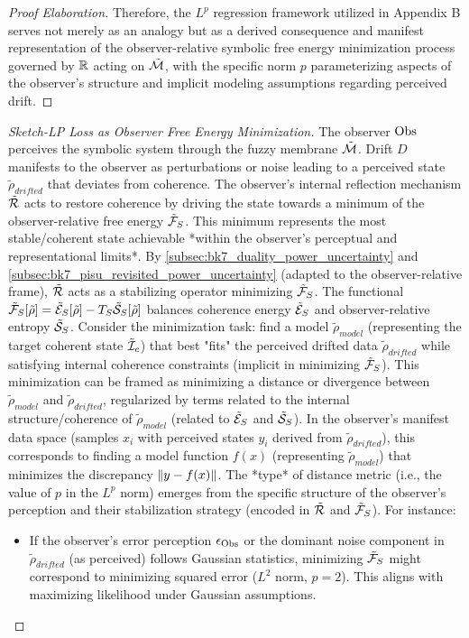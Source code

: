 \begin{proof}[Proof Elaboration]
Therefore, the \( L^p \) regression framework utilized in Appendix B serves not merely as an analogy but as a derived consequence and manifest representation of the observer-relative symbolic free energy minimization process governed by \( \mathbb{R} \) acting on \( \tilde{\mathcal{M}} \), with the specific norm \( p \) parameterizing aspects of the observer's structure and implicit modeling assumptions regarding perceived drift.
\end{proof}
\begin{proof}[Sketch-LP Loss as Observer Free Energy Minimization]
\label{proof:bk7_sketch_lp_loss_as_observer_free_energy_minimization}
The observer $\mathrm{Obs}$ perceives the symbolic system through the fuzzy membrane $\tilde{\mathcal{M}}$. Drift $D$ manifests to the observer as perturbations or noise leading to a perceived state $\tilde{\rho}_{drifted}$ that deviates from coherence. The observer's internal reflection mechanism $\tilde{\mathcal{R}}$ acts to restore coherence by driving the state towards a minimum of the observer-relative free energy $\tilde{\mathcal{F}}_S$. This minimum represents the most stable/coherent state achievable *within the observer's perceptual and representational limits*.
By \ref{subsec:bk7_duality_power_uncertainty} and \ref{subsec:bk7_pisu_revisited_power_uncertainty} (adapted to the observer-relative frame), $\tilde{\mathcal{R}}$ acts as a stabilizing operator minimizing $\tilde{\mathcal{F}}_S$. The functional $\tilde{\mathcal{F}}_S[\tilde{\rho}] = \tilde{\mathcal{E}}_S[\tilde{\rho}] - T_S \tilde{\mathcal{S}}_S[\tilde{\rho}]$ balances coherence energy $\tilde{\mathcal{E}}_S$ and observer-relative entropy $\tilde{\mathcal{S}}_S$.
Consider the minimization task: find a model $\tilde{\rho}_{model}$ (representing the target coherent state $\tilde{\mathcal{I}}_c$) that best "fits" the perceived drifted data $\tilde{\rho}_{drifted}$ while satisfying internal coherence constraints (implicit in minimizing $\tilde{\mathcal{F}}_S$). This minimization can be framed as minimizing a distance or divergence between $\tilde{\rho}_{model}$ and $\tilde{\rho}_{drifted}$, regularized by terms related to the internal structure/coherence of $\tilde{\rho}_{model}$ (related to $\tilde{\mathcal{E}}_S$ and $\tilde{\mathcal{S}}_S$).
In the observer's manifest data space (samples $x_i$ with perceived states $y_i$ derived from $\tilde{\rho}_{drifted}$), this corresponds to finding a model function $f(x)$ (representing $\tilde{\rho}_{model}$) that minimizes the discrepancy $\left\|y - f(x)\right\|$. The *type* of distance metric (i.e., the value of $p$ in the $L^p$ norm) emerges from the specific structure of the observer's perception and their stabilization strategy (encoded in $\tilde{\mathcal{R}}$ and $\tilde{\mathcal{F}}_S$).
For instance:
\begin{itemize}
    \item If the observer's error perception $\epsilon_{\mathrm{Obs}}$ or the dominant noise component in $\tilde{\rho}_{drifted}$ (as perceived) follows Gaussian statistics, minimizing $\tilde{\mathcal{F}}_S$ might correspond to minimizing squared error ($L^2$ norm, $p=2$). This aligns with maximizing likelihood under Gaussian assumptions.

\end{itemize}
\end{proof}
